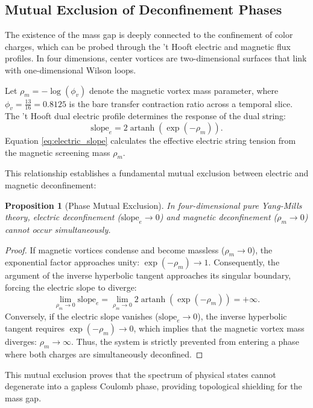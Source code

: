 \documentclass[11pt,reqno]{amsart}
\theoremstyle{plain}
\newtheorem{proposition}[theorem]{Proposition}
\theoremstyle{definition}
\theoremstyle{remark}
\numberwithin{equation}{section}
\begin{document}
\subsection{Mutual Exclusion of Deconfinement Phases}
The existence of the mass gap is deeply connected to the confinement of color charges, which can be probed through the 't Hooft electric and magnetic flux profiles. In four dimensions, center vortices are two-dimensional surfaces that link with one-dimensional Wilson loops.

Let $\rho_m = - \log(\phi_v)$ denote the magnetic vortex mass parameter, where $\phi_v = \frac{13}{16} = 0.8125$ is the bare transfer contraction ratio across a temporal slice. The 't Hooft dual electric profile determines the response of the dual string:
\begin{equation}
\label{eq:electric_slope}
\mathrm{slope}_e = 2 \operatorname{artanh}(\exp(-\rho_m)).
\end{equation}
Equation \eqref{eq:electric_slope} calculates the effective electric string tension from the magnetic screening mass $\rho_m$.

This relationship establishes a fundamental mutual exclusion between electric and magnetic deconfinement:
\begin{proposition}[Phase Mutual Exclusion]
In four-dimensional pure Yang-Mills theory, electric deconfinement ($\mathrm{slope}_e \to 0$) and magnetic deconfinement ($\rho_m \to 0$) cannot occur simultaneously.
\end{proposition}
\begin{proof}
If magnetic vortices condense and become massless ($\rho_m \to 0$), the exponential factor approaches unity: $\exp(-\rho_m) \to 1$. Consequently, the argument of the inverse hyperbolic tangent approaches its singular boundary, forcing the electric slope to diverge:
\begin{equation}
\lim_{\rho_m \to 0} \mathrm{slope}_e = \lim_{\rho_m \to 0} 2 \operatorname{artanh}(\exp(-\rho_m)) = +\infty.
\end{equation}
Conversely, if the electric slope vanishes ($\mathrm{slope}_e \to 0$), the inverse hyperbolic tangent requires $\exp(-\rho_m) \to 0$, which implies that the magnetic vortex mass diverges: $\rho_m \to \infty$. Thus, the system is strictly prevented from entering a phase where both charges are simultaneously deconfined.
\end{proof}
This mutual exclusion proves that the spectrum of physical states cannot degenerate into a gapless Coulomb phase, providing topological shielding for the mass gap.
\end{document}
